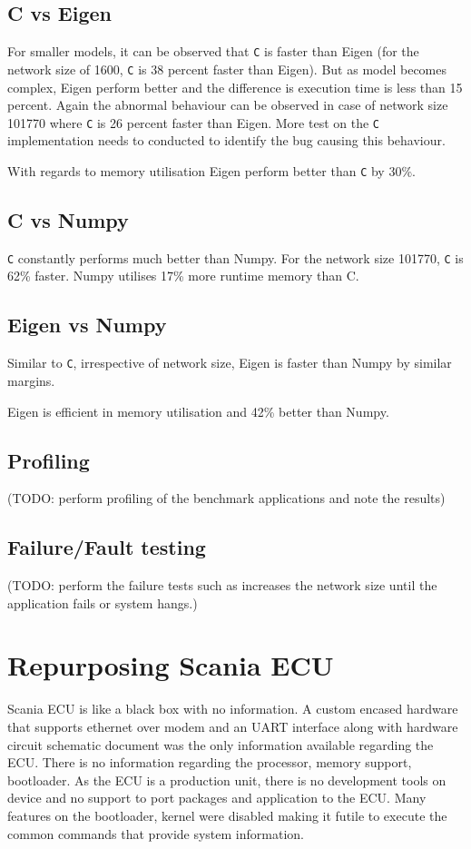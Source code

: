 \subsection{C vs Eigen}
For smaller models, it can be observed that \verb!C! is faster than Eigen (for the network size of 1600, \verb!C! is 38 percent faster than Eigen). But as model becomes complex, Eigen perform better and the difference is execution time is less than 15 percent. Again the abnormal behaviour can be observed in case of network size 101770 where \verb!C! is 26 percent faster than Eigen. More test on the \verb!C! implementation needs to conducted to identify the bug causing this behaviour.

With regards to memory utilisation Eigen perform better than \verb!C! by 30\%.

\subsection{C vs Numpy}
\verb!C! constantly performs much better than Numpy. For the network size 101770, \verb!C! is 62\% faster.
Numpy utilises 17\% more runtime memory than C.

\subsection{Eigen vs Numpy}
Similar to \verb!C!, irrespective of network size, Eigen is faster than Numpy by similar margins.

Eigen is efficient in memory utilisation and 42\% better than Numpy.

\subsection{Profiling}
(TODO: perform profiling of the benchmark applications and note the results)

\subsection{Failure/Fault testing}
(TODO: perform the failure tests such as increases the network size until the application fails or system hangs.)

\section{Repurposing Scania ECU}
Scania ECU is like a black box with no information. A custom encased hardware that supports ethernet over modem and an UART interface along with hardware circuit schematic document was the only information available regarding the ECU. There is no information regarding the processor,  memory support, bootloader. As the ECU is a production unit, there is no development tools on device and no support to port packages and application to the ECU. Many features on the bootloader, kernel were disabled making it futile to execute the common commands that provide system information.

